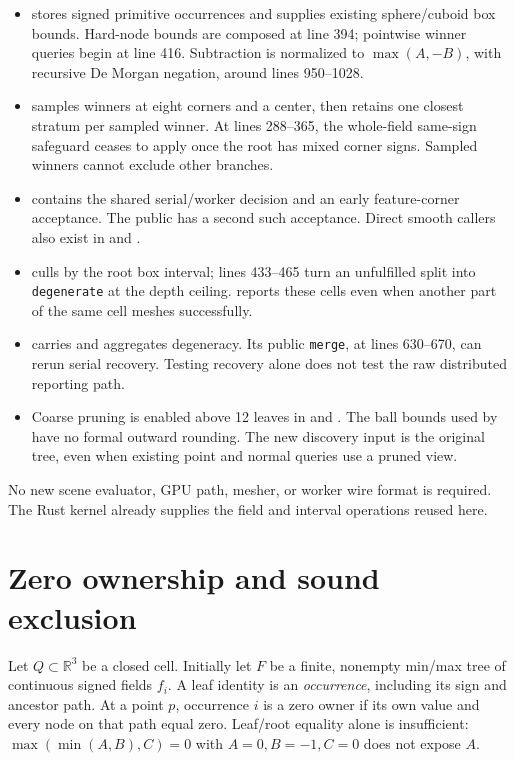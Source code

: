 \documentclass[11pt]{article}
\newcommand{\R}{\mathbb R}
\begin{document}
\begin{itemize}
\item {} stores signed primitive occurrences and supplies
existing sphere/cuboid box bounds. Hard-node bounds are composed at line 394;
pointwise winner queries begin at line 416. Subtraction is normalized to
\(\max(A,-B)\), with recursive De Morgan negation, around lines 950--1028.
\item {} samples winners at eight
corners and a center, then retains one closest stratum per sampled winner.
At lines 288--365, the whole-field same-sign safeguard ceases to apply once
the root has mixed corner signs. Sampled winners cannot exclude other branches.
\item {} contains the shared serial/worker
decision and an early feature-corner acceptance. The public
 has a second such acceptance. Direct smooth
callers also exist in  and
.
\item {} culls by the root box interval;
lines 433--465 turn an unfulfilled split into \texttt{degenerate} at the
depth ceiling.  reports these cells even
when another part of the same cell meshes successfully.
\item {} carries and aggregates degeneracy.
Its public \texttt{merge}, at lines 630--670, can rerun serial recovery.
Testing recovery alone does not test the raw distributed reporting path.
\item Coarse pruning is enabled above 12 leaves in
 and .
The ball bounds used by  have no formal outward
rounding. The new discovery input is the original tree, even when existing
point and normal queries use a pruned view.
\end{itemize}

No new scene evaluator, GPU path, mesher, or worker wire format is required.
The Rust kernel already supplies the field and interval operations reused here.

\section{Zero ownership and sound exclusion}

Let \(Q\subset\R^3\) be a closed cell. Initially let \(F\) be a finite,
nonempty min/max tree of continuous signed fields \(f_i\).
A leaf identity is an \emph{occurrence}, including its sign and ancestor path.
At a point \(p\), occurrence \(i\) is a zero owner if its own value and every
node on that path equal zero. Leaf/root equality alone is insufficient:
\(\max(\min(A,B),C)=0\) with \(A=0,B=-1,C=0\) does not expose \(A\).
\end{document}
